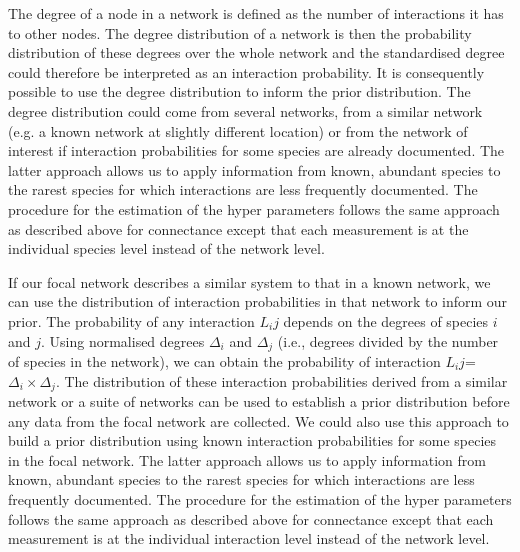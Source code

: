 \documentclass[12pt]{article}
\begin{document}

          The degree of a node in a network is defined as the number of interactions it has to other nodes. The degree distribution of a network is then the probability distribution of these degrees over the whole network and the standardised degree could therefore be interpreted as an interaction probability. It is consequently possible to use the degree distribution to inform the prior distribution. The degree distribution could come from several networks, from a similar network (e.g. a known network at slightly different location) or from the network of interest if interaction probabilities for some species are already documented. The latter approach allows us to apply information from known, abundant species to the rarest species for which interactions are less frequently documented. The procedure for the estimation of the hyper parameters follows the same approach as described above for connectance except that each measurement is at the individual species level instead of the network level.
         
          If our focal network describes a similar system to that in a known network, we can use the distribution of interaction probabilities in that network to inform our prior. The probability of any interaction $L_ij$ depends on the degrees of species $i$ and $j$. Using normalised degrees $\Delta_i$ and $\Delta_j$ (i.e., degrees divided by the number of species in the network), we can obtain the probability of interaction $L_ij$=$\Delta_i\times\Delta_j$. The distribution of these interaction probabilities derived from a similar network or a suite of networks can be used to establish a prior distribution before any data from the focal network are collected. We could also use this approach to build a prior distribution using known interaction probabilities for some species in the focal network. The latter approach allows us to apply information from known, abundant species to the rarest species for which interactions are less frequently documented. The procedure for the estimation of the hyper parameters follows the same approach as described above for connectance except that each measurement is at the individual interaction level instead of the network level.
\end{document}

